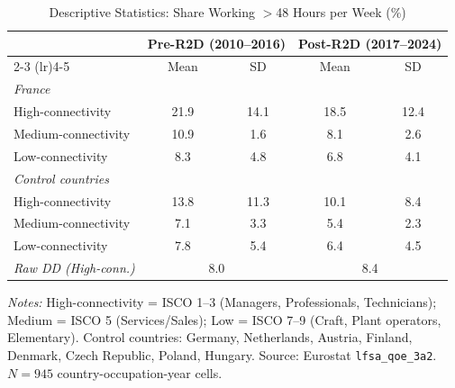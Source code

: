 \begin{table}[htbp]
\centering
\caption{Descriptive Statistics: Share Working $>$48 Hours per Week (\%)}
\label{tab:descriptive}
\begin{tabular}{lcccc}
\toprule
 & \multicolumn{2}{c}{Pre-R2D (2010--2016)} & \multicolumn{2}{c}{Post-R2D (2017--2024)} \\
\cmidrule(lr){2-3} \cmidrule(lr){4-5}
 & Mean & SD & Mean & SD \\
\midrule
\textit{France} & & & & \\
\quad High-connectivity & 21.9 & 14.1 & 18.5 & 12.4 \\
\quad Medium-connectivity & 10.9 & 1.6 & 8.1 & 2.6 \\
\quad Low-connectivity & 8.3 & 4.8 & 6.8 & 4.1 \\
\addlinespace
\textit{Control countries} & & & & \\
\quad High-connectivity & 13.8 & 11.3 & 10.1 & 8.4 \\
\quad Medium-connectivity & 7.1 & 3.3 & 5.4 & 2.3 \\
\quad Low-connectivity & 7.8 & 5.4 & 6.4 & 4.5 \\
\addlinespace
\textit{Raw DD (High-conn.)} & \multicolumn{2}{c}{8.0} & \multicolumn{2}{c}{8.4} \\
\bottomrule
\end{tabular}
\begin{tablenotes}
\small
\item \textit{Notes:} High-connectivity = ISCO 1--3 (Managers, Professionals, Technicians);
Medium = ISCO 5 (Services/Sales); Low = ISCO 7--9 (Craft, Plant operators, Elementary).
Control countries: Germany, Netherlands, Austria, Finland, Denmark, Czech Republic, Poland, Hungary.
Source: Eurostat \texttt{lfsa\_qoe\_3a2}. $N = 945$ country-occupation-year cells.
\end{tablenotes}
\end{table}
